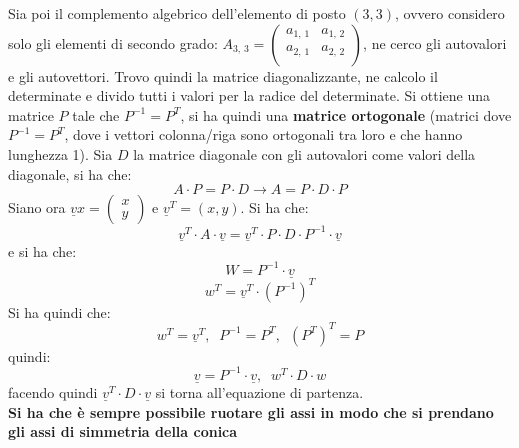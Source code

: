 \documentclass[a4paper,12pt, oneside]{book}
\begin{document}
\begin{teorema}
	Sia poi il complemento algebrico dell'elemento di posto $(3,3)$, ovvero considero solo gli elementi di secondo grado: $A_{3,\,3}=\left(\begin{matrix}
				a_{1,\,1} & a_{1,\,2} \\
				a_{2,\,1} & a_{2,\,2} \\
			\end{matrix}\right)$, ne cerco gli autovalori e gli autovettori. Trovo quindi la matrice diagonalizzante, ne calcolo il determinate e divido tutti i valori per la radice del determinate. Si ottiene una matrice $P$ tale che $P^{-1}=P^T$, si ha quindi una \textbf{matrice ortogonale} (matrici dove $P^{-1}=P^T$, dove i vettori colonna/riga sono ortogonali tra loro e che hanno lunghezza 1). Sia $D$ la matrice diagonale con gli autovalori come valori della diagonale, si ha che:
	$$A\cdot P=P\cdot D\longrightarrow A=P\cdot D\cdot P$$
	Siano ora $\underline{v}x=
		\left(\begin{matrix}
				x \\
				y
			\end{matrix}\right)
	$ e $\underline{v}^T=(x,y)$. Si ha che:
	$$\underline{v}^T\cdot A\cdot \underline{v}=\underline{v}^T\cdot P\cdot D\cdot P^{-1}\cdot \underline{v}$$ e si ha che:
	$$W=P^{-1}\cdot \underline{v}$$
	$$w^T=\underline{v}^T\cdot (P^{-1})^T$$
	Si ha quindi che:
	$$w^T=\underline{v}^T,\,\,\ P^{-1}=P^T,\,\,\, (P^T)^T=P$$
	quindi:
	$$\underline{v}=P^{-1}\cdot \underline{v},\,\,\ w^T\cdot D\cdot w$$
	facendo quindi $\underline{v}^T\cdot D\cdot \underline{v}$ si torna all'equazione di partenza.\\
	\textbf{Si ha che è sempre possibile ruotare gli assi in modo che si prendano gli assi di simmetria della conica}
\end{teorema}
\end{document}
